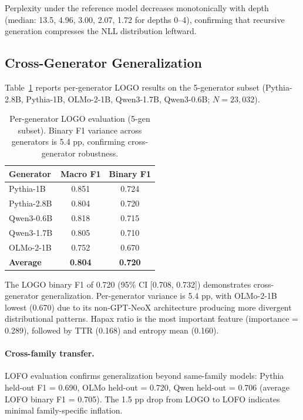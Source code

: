 \documentclass[11pt,twocolumn]{article}
\begin{document}
Perplexity under the reference model decreases monotonically with depth (median: 13.5, 4.96, 3.00, 2.07, 1.72 for depths 0--4), confirming that recursive generation compresses the NLL distribution leftward.

\subsection{Cross-Generator Generalization}
\label{sec:crossgen}

Table~\ref{tab:crossgen} reports per-generator LOGO results on the 5-generator subset (Pythia-2.8B, Pythia-1B, OLMo-2-1B, Qwen3-1.7B, Qwen3-0.6B; $N = 23{,}032$).

\begin{table}[t]
\centering
\small
\begin{tabular}{lcc}
\toprule
\textbf{Generator} & \textbf{Macro F1} & \textbf{Binary F1} \\
\midrule
Pythia-1B & 0.851 & 0.724 \\
Pythia-2.8B & 0.804 & 0.720 \\
Qwen3-0.6B & 0.818 & 0.715 \\
Qwen3-1.7B & 0.805 & 0.710 \\
OLMo-2-1B & 0.752 & 0.670 \\
\midrule
\textbf{Average} & \textbf{0.804} & \textbf{0.720} \\
\bottomrule
\end{tabular}
\caption{Per-generator LOGO evaluation (5-gen subset). Binary F1 variance across generators is 5.4 pp, confirming cross-generator robustness.}
\label{tab:crossgen}
\end{table}

The LOGO binary F1 of 0.720 (95\% CI [0.708, 0.732]) demonstrates cross-generator generalization.
Per-generator variance is 5.4 pp, with OLMo-2-1B lowest (0.670) due to its non-GPT-NeoX architecture producing more divergent distributional patterns.
Hapax ratio is the most important feature (importance = 0.289), followed by TTR (0.168) and entropy mean (0.160).

\paragraph{Cross-family transfer.}
LOFO evaluation confirms generalization beyond same-family models: Pythia held-out F1 = 0.690, OLMo held-out = 0.720, Qwen held-out = 0.706 (average LOFO binary F1 = 0.705).
The 1.5 pp drop from LOGO to LOFO indicates minimal family-specific inflation.
\end{document}
